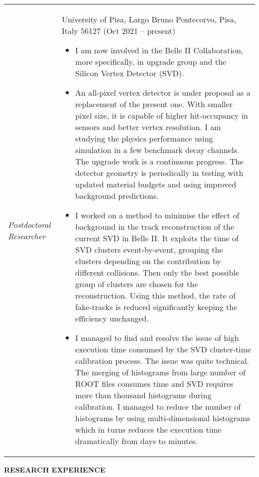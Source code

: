 \documentclass[12pt]{article}
\begin{document}
\begin{minipage}{1.05\textwidth}
\vspace{0.4cm}
\begin{tabular}{p{2.5cm} p{14.5cm} }
  {\emph{Postdoctoral Researcher}} & University of Pisa, Largo Bruno Pontecorvo, Pisa, Italy 56127 (Oct 2021 -- present)

  \begin{itemize}
  \item I am now involved in the Belle II Collaboration, more
    specifically, in upgrade group and the Silicon Vertex Detector (SVD).
  \item An all-pixel vertex detector is under proposal as a replacement of
    the present one. With smaller pixel size, it is capable of higher
    hit-occupancy in sensors and better vertex resolution.
    I am studying the physics performance using simulation in a
    few benchmark decay channels.
    The upgrade work is a continuous progress. The detector geometry is
    periodically in testing with updated material budgets and using improved
    background predictions.
  \item I worked on a method to minimise the effect of background in the
    track reconstruction of the current SVD in Belle II.
    It exploits the time of SVD clusters event-by-event, grouping the clusters
    depending on the contribution by different collisions.
    Then only the best possible group of
    clusters are chosen for the reconstruction. Using this method,
    the rate of fake-tracks is reduced significantly keeping the efficiency
    unchanged.
  \item I managed to find and resolve the issue of high execution time consumed by
    the SVD cluster-time calibration process. The issue was quite technical.
    The merging of histograms from large number of ROOT files consumes time and
    SVD requires more than thousand histograms during calibration.
    I managed to reduce the number of histograms by using multi-dimensional
    histograms which in turns reduces
    the execution time dramatically from days to minutes.
  \end{itemize}

\end{tabular}
\end{minipage}

\pagebreak
\vspace{0.5cm}
\colorbox{gray!40}{\begin{minipage}{17.5cm}
\bf {RESEARCH EXPERIENCE } 
\end{minipage} }
\end{document}
